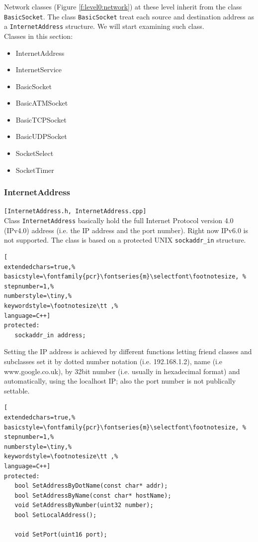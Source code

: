 Network classes (Figure \ref{f:level0:network}) at these level inherit from the class \texttt{BasicSocket}. The class \texttt{BasicSocket} treat each source and destination address as a \texttt{InternetAddress} structure. We will start examining such class. \\

Classes in this section:
\begin{itemize}
 \item InternetAddress
 \item InternetService
 \item BasicSocket
 \item BasicATMSocket
 \item BasicTCPSocket
 \item BasicUDPSocket
 \item SocketSelect
 \item SocketTimer
\end{itemize}



\subsubsection{InternetAddress}
\texttt{[InternetAddress.h, InternetAddress.cpp]}\\
Class \texttt{InternetAddress} basically hold the full Internet Protocol version 4.0 (IPv4.0) address (i.e. the IP address and the port number). Right now IPv6.0 is not supported. The class is based on a protected UNIX \texttt{sockaddr\_in} structure.

\begin{lstlisting}[
extendedchars=true,%
basicstyle=\fontfamily{pcr}\fontseries{m}\selectfont\footnotesize, %
stepnumber=1,%
numberstyle=\tiny,%
keywordstyle=\footnotesize\tt ,%
language=C++]
protected:
   sockaddr_in address;
\end{lstlisting}

Setting the IP address is achieved by different functions letting friend classes and subclasses set it by dotted number notation (i.e. 192.168.1.2), name (i.e www.google.co.uk), by 32bit number (i.e. usually in hexadecimal format) and automatically, using the localhost IP; also the port number is not publically settable.

\begin{lstlisting}[
extendedchars=true,%
basicstyle=\fontfamily{pcr}\fontseries{m}\selectfont\footnotesize, %
stepnumber=1,%
numberstyle=\tiny,%
keywordstyle=\footnotesize\tt ,%
language=C++]
protected:
   bool SetAddressByDotName(const char* addr);
   bool SetAddressByName(const char* hostName);
   void SetAddressByNumber(uint32 number);
   bool SetLocalAddress();

   void SetPort(uint16 port);
\end{lstlisting}

